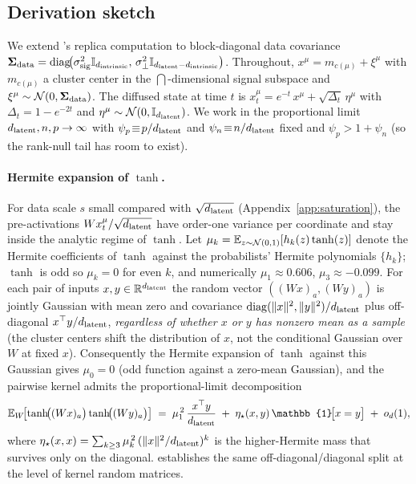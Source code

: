 \subsection{Derivation sketch}

We extend \citeauthor{bonnaire2025}'s replica computation to block-diagonal data covariance
\(\bm{\Sigma}_{\mathrm{data}} = \operatorname{diag}\!\bigl(\sigma_{\mathrm{sig}}^2\mathbb{I}_{d_{\mathrm{intrinsic}}},\,
                           \sigma_{\perp}^2\mathbb{I}_{d_{\mathrm{latent}} - d_{\mathrm{intrinsic}}}\bigr)\).
Throughout, $x^\mu = m_{c(\mu)} + \xi^\mu$ with $m_{c(\mu)}$ a cluster
center in the $\dint$-dimensional signal subspace and
$\xi^\mu \sim \mathcal{N}(0, \bm{\Sigma}_{\mathrm{data}})$. The diffused state at time
$t$ is $x_t^\mu = e^{-t}\,x^\mu + \sqrt{\Delta_t}\,\eta^\mu$ with
$\Delta_t = 1 - e^{-2t}$ and $\eta^\mu \sim \mathcal{N}(0, \mathbb{I}_{d_{\mathrm{latent}}})$.
We work in the proportional limit $d_{\mathrm{latent}},n,p\to\infty$ with
$\psi_p\!\equiv\!p/d_{\mathrm{latent}}$ and $\psi_n\!\equiv\!n/d_{\mathrm{latent}}$ fixed
and $\psi_p > 1 + \psi_n$ (so the rank-null tail has room to exist).

\paragraph{Hermite expansion of $\tanh$.}
For data scale $s$ small compared with $\sqrt{d_{\mathrm{latent}}}$
(Appendix~\ref{app:saturation}), the pre-activations
$Wx_t^\mu/\sqrt{d_{\mathrm{latent}}}$ have order-one variance per coordinate and stay
inside the analytic regime of $\tanh$. Let
$\mu_k = \mathbb{E}_{z\sim\mathcal{N}(0,1)}[h_k(z)\tanh(z)]$ denote the
Hermite coefficients of $\tanh$ against the probabilists' Hermite
polynomials $\{h_k\}$; $\tanh$ is odd so $\mu_k = 0$ for even $k$,
and numerically $\mu_1 \approx 0.606$, $\mu_3 \approx -0.099$.
For each pair of inputs $x,y\in\mathbb{R}^{d_{\mathrm{latent}}}$ the random vector
$((Wx)_a,(Wy)_a)$ is jointly Gaussian with mean zero and covariance
$\operatorname{diag}(\|x\|^2,\|y\|^2)/d_{\mathrm{latent}}$ plus off-diagonal $x^\top y/d_{\mathrm{latent}}$,
\emph{regardless of whether $x$ or $y$ has nonzero mean as a sample}
(the cluster centers shift the distribution of $x$, not the
conditional Gaussian over $W$ at fixed $x$). Consequently the Hermite
expansion of $\tanh$ against this Gaussian gives $\mu_0=0$
(odd function against a zero-mean Gaussian), and the pairwise kernel
admits the proportional-limit decomposition
\citep{pennington2017nonlinear, benigni2021eigenvalue}
\begin{equation}
  \E_W\!\bigl[\tanh\!\bigl((Wx)_a\bigr)\tanh\!\bigl((Wy)_a\bigr)\bigr]
   \;=\; \mu_1^{\,2}\,\frac{x^\top y}{\dlat}
        \;+\; \eta_\star(x,y)\,\mathbb{1}\!\bigl[x=y\bigr]
        \;+\; o_d(1),
  \label{eq:kernel-decomp}
\end{equation}
where $\eta_\star(x,x) = \sum_{k\ge 3}\mu_k^{\,2}\,(\|x\|^2/d_{\mathrm{latent}})^k$
is the higher-Hermite mass that survives only on the diagonal.
\citet{ELKaroui2010spectrum} establishes the same off-diagonal/diagonal
split at the level of kernel random matrices.



